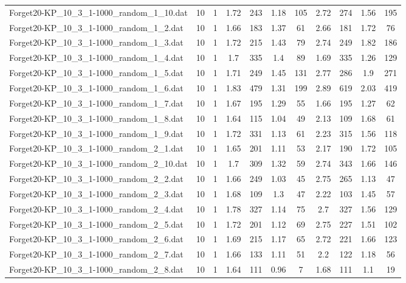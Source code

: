 \begin{table}[!ht]
\begin{tabular}{lcccccccccc}
Forget20-KP\_10\_3\_1-1000\_random\_1\_10.dat & 10 & 1 & 1.72 & 243 & 1.18 & 105 & 2.72 & 274 & 1.56 & 195 \\
Forget20-KP\_10\_3\_1-1000\_random\_1\_2.dat & 10 & 1 & 1.66 & 183 & 1.37 & 61 & 2.66 & 181 & 1.72 & 76 \\
Forget20-KP\_10\_3\_1-1000\_random\_1\_3.dat & 10 & 1 & 1.72 & 215 & 1.43 & 79 & 2.74 & 249 & 1.82 & 186 \\
Forget20-KP\_10\_3\_1-1000\_random\_1\_4.dat & 10 & 1 & 1.7 & 335 & 1.4 & 89 & 1.69 & 335 & 1.26 & 129 \\
Forget20-KP\_10\_3\_1-1000\_random\_1\_5.dat & 10 & 1 & 1.71 & 249 & 1.45 & 131 & 2.77 & 286 & 1.9 & 271 \\
Forget20-KP\_10\_3\_1-1000\_random\_1\_6.dat & 10 & 1 & 1.83 & 479 & 1.31 & 199 & 2.89 & 619 & 2.03 & 419 \\
Forget20-KP\_10\_3\_1-1000\_random\_1\_7.dat & 10 & 1 & 1.67 & 195 & 1.29 & 55 & 1.66 & 195 & 1.27 & 62 \\
Forget20-KP\_10\_3\_1-1000\_random\_1\_8.dat & 10 & 1 & 1.64 & 115 & 1.04 & 49 & 2.13 & 109 & 1.68 & 61 \\
Forget20-KP\_10\_3\_1-1000\_random\_1\_9.dat & 10 & 1 & 1.72 & 331 & 1.13 & 61 & 2.23 & 315 & 1.56 & 118 \\
Forget20-KP\_10\_3\_1-1000\_random\_2\_1.dat & 10 & 1 & 1.65 & 201 & 1.11 & 53 & 2.17 & 190 & 1.72 & 105 \\
Forget20-KP\_10\_3\_1-1000\_random\_2\_10.dat & 10 & 1 & 1.7 & 309 & 1.32 & 59 & 2.74 & 343 & 1.66 & 146 \\
Forget20-KP\_10\_3\_1-1000\_random\_2\_2.dat & 10 & 1 & 1.66 & 249 & 1.03 & 45 & 2.75 & 265 & 1.13 & 47 \\
Forget20-KP\_10\_3\_1-1000\_random\_2\_3.dat & 10 & 1 & 1.68 & 109 & 1.3 & 47 & 2.22 & 103 & 1.45 & 57 \\
Forget20-KP\_10\_3\_1-1000\_random\_2\_4.dat & 10 & 1 & 1.78 & 327 & 1.14 & 75 & 2.7 & 327 & 1.56 & 129 \\
Forget20-KP\_10\_3\_1-1000\_random\_2\_5.dat & 10 & 1 & 1.72 & 201 & 1.12 & 69 & 2.75 & 227 & 1.51 & 102 \\
Forget20-KP\_10\_3\_1-1000\_random\_2\_6.dat & 10 & 1 & 1.69 & 215 & 1.17 & 65 & 2.72 & 221 & 1.66 & 123 \\
Forget20-KP\_10\_3\_1-1000\_random\_2\_7.dat & 10 & 1 & 1.66 & 133 & 1.11 & 51 & 2.2 & 122 & 1.18 & 56 \\
Forget20-KP\_10\_3\_1-1000\_random\_2\_8.dat & 10 & 1 & 1.64 & 111 & 0.96 & 7 & 1.68 & 111 & 1.1 & 19 \\

\end{tabular}
\end{table}
